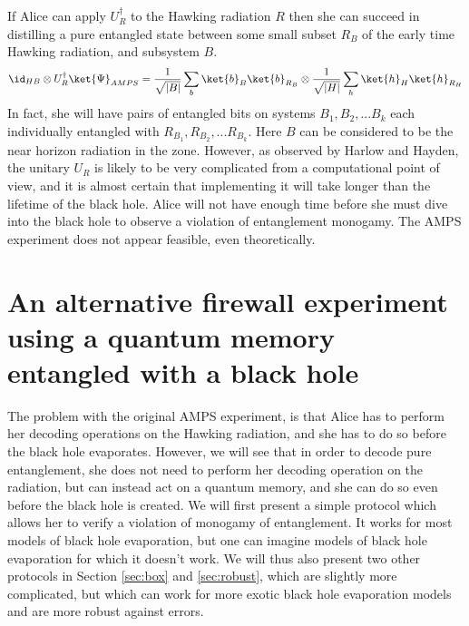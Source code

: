 \documentclass[11pt,a4paper]{article}
\begin{document}
If Alice can apply  $U^\dagger_R$ to the  Hawking radiation $R$ then she can succeed in distilling a pure entangled state 
between some small subset $R_B$ of the early time Hawking radiation, and subsystem $B$.
\begin{align}
\id_{HB}\otimes U^\dagger_R\ket{\Psi}_{AMPS}= \frac{1}{\sqrt{|B|}}\sum_{b}\ket{b}_B\ket{b}_{R_B}\otimes\frac{1}{\sqrt{|H|}}\sum_{h}\ket{h}_H\ket{h}_{R_H}
\end{align}
In fact, she will have pairs of entangled bits on systems $B_1,B_2,...B_k$ each individually entangled with  $R_{B_1},R_{B_2},...R_{B_k}$. Here $B$ can be considered to be the near horizon radiation in the zone. However, as observed by Harlow and Hayden, the unitary $U_R$ is likely to be very complicated from a computational point of view, and it is almost certain that implementing it will take longer than the lifetime of the black hole. Alice will not have enough time before she must dive into the black hole to observe a violation of entanglement monogamy. The AMPS experiment does not appear feasible, even theoretically.


 
\section{An alternative firewall experiment using a quantum memory entangled with a black hole}
\label{sec:alternative}

The problem with the original AMPS experiment, is that Alice has to perform her decoding operations on the Hawking radiation, and she has to do so before the black hole evaporates. However, we will see that in order to decode pure entanglement, she does not need to perform her decoding operation on the radiation, but can instead act on a quantum memory, and she can do so even before the black hole is created. We will first present a simple protocol which allows her to verify a violation of monogamy of entanglement. 
It works for most models of black hole evaporation, but one can imagine models of black hole evaporation for which it doesn't work. We will thus also present two other protocols in Section \ref{sec:box} and \ref{sec:robust}, which are slightly more complicated, but which can work for more exotic black hole evaporation models and are more robust against errors.
\end{document}
